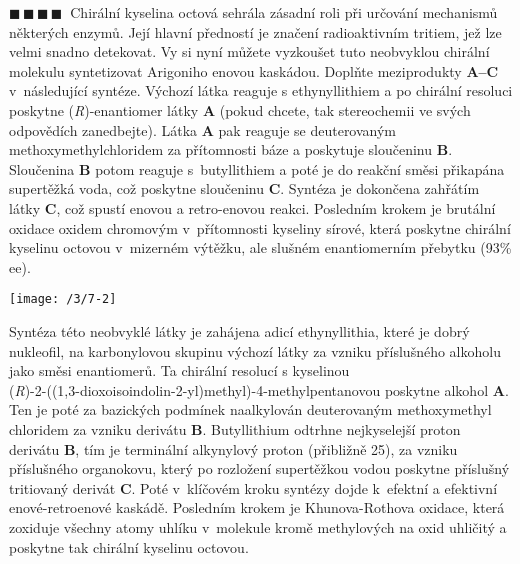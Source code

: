 \documentclass{book}
\newcommand{\ctyri}{$\blacksquare \, \blacksquare \, \blacksquare \, \blacksquare \; \; $}
\renewenvironment{quotation}{\par}{\par} %
\begin{document}
\newpage %
\begin{quotation}
\ctyri Chirální kyselina octová sehrála zásadní roli při určování mechanismů
některých enzymů. Její hlavní předností je značení radioaktivním tritiem,
jež lze velmi snadno detekovat. Vy si nyní můžete vyzkoušet tuto neobvyklou
chirální molekulu syntetizovat Arigoniho enovou kaskádou. Doplňte
meziprodukty \textbf{A--C} v~následující syntéze. Výchozí látka reaguje
s ethynyllithiem a po chirální resoluci poskytne (\textit{R})-enantiomer látky
\textbf{A} (pokud chcete, tak stereochemii ve svých odpovědích zanedbejte).
Látka \textbf{A} pak reaguje se deuterovaným methoxymethylchloridem
za přítomnosti báze a poskytuje sloučeninu \textbf{B}. Sloučenina
\textbf{B} potom reaguje s~butyllithiem a poté je do reakční směsi
přikapána supertěžká voda, což poskytne sloučeninu \textbf{C}. Syntéza
je dokončena zahřátím látky \textbf{C}, což spustí enovou a retro-enovou
reakci. Posledním krokem je brutální oxidace oxidem chromovým v~přítomnosti
kyseliny sírové, která poskytne chirální kyselinu octovou v~mizerném
výtěžku, ale slušném enantiomerním přebytku (93\% ee).

\begin{center}
\texttt{[image: /3/7-2]}
\end{center}
\end{quotation} \dotfill \par 
Syntéza této neobvyklé látky je zahájena adicí ethynyllithia, které
je dobrý nukleofil, na karbonylovou skupinu výchozí látky za vzniku
příslušného alkoholu jako směsi enantiomerů. Ta chirální resolucí
s kyselinou\\(\textit{R})-2-((1,3-dioxoisoindolin-2-yl)methyl)-4-methylpentanovou
poskytne alkohol \textbf{A}. Ten je poté za bazických podmínek naalkylován
deuterovaným methoxymethyl chloridem za vzniku derivátu \textbf{B}.
Butyllithium odtrhne nejkyselejší proton derivátu \textbf{B}, tím
je terminální alkynylový proton (\pKa přibližně 25),
za vzniku příslušného organokovu, který po rozložení supertěžkou vodou
poskytne příslušný tritiovaný derivát \textbf{C}. Poté v~klíčovém
kroku syntézy dojde k~efektní a efektivní enové-retroenové kaskádě.
Posledním krokem je Khunova-Rothova oxidace, která zoxiduje všechny atomy
uhlíku v~molekule kromě methylových na oxid uhličitý a poskytne tak
chirální kyselinu octovou.
\end{document}
